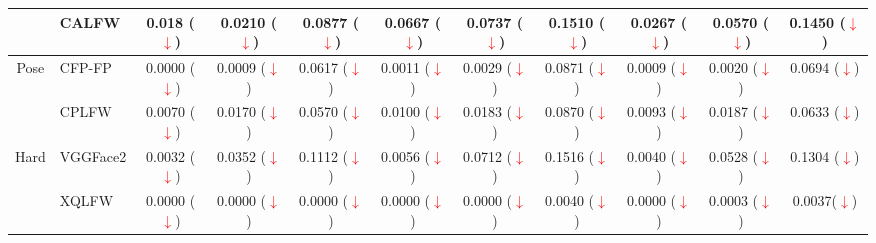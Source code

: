 \documentclass[class=report, crop=false, a4paper, 12pt]{standalone}
\begin{document}
\begin{table}[H]
{\begin{tabular}{cl|ccc|ccc|ccc|}
    \multicolumn{1}{|c|}{}                         & CALFW    & \multicolumn{1}{c|}{0.018 (\textcolor{red}{$\downarrow$})}  & \multicolumn{1}{c|}{0.0210 (\textcolor{red}{$\downarrow$})} & 0.0877 (\textcolor{red}{$\downarrow$}) & \multicolumn{1}{c|}{0.0667 (\textcolor{red}{$\downarrow$})} & \multicolumn{1}{c|}{0.0737 (\textcolor{red}{$\downarrow$})} & 0.1510 (\textcolor{red}{$\downarrow$}) & \multicolumn{1}{c|}{0.0267 (\textcolor{red}{$\downarrow$})} & \multicolumn{1}{c|}{0.0570 (\textcolor{red}{$\downarrow$})} & 0.1450 (\textcolor{red}{$\downarrow$}) \\ \hline
    \multicolumn{1}{|c|}{\multirow{2}{*}{Pose}}    & CFP-FP   & \multicolumn{1}{c|}{0.0000 (\textcolor{red}{$\downarrow$})} & \multicolumn{1}{c|}{0.0009 (\textcolor{red}{$\downarrow$})} & 0.0617 (\textcolor{red}{$\downarrow$}) & \multicolumn{1}{c|}{0.0011 (\textcolor{red}{$\downarrow$})} & \multicolumn{1}{c|}{0.0029 (\textcolor{red}{$\downarrow$})} & 0.0871 (\textcolor{red}{$\downarrow$}) & \multicolumn{1}{c|}{0.0009 (\textcolor{red}{$\downarrow$})} & \multicolumn{1}{c|}{0.0020 (\textcolor{red}{$\downarrow$})} & 0.0694 (\textcolor{red}{$\downarrow$}) \\ \cline{2-11} 
    \multicolumn{1}{|c|}{}                         & CPLFW    & \multicolumn{1}{c|}{0.0070 (\textcolor{red}{$\downarrow$})} & \multicolumn{1}{c|}{0.0170 (\textcolor{red}{$\downarrow$})} & 0.0570 (\textcolor{red}{$\downarrow$}) & \multicolumn{1}{c|}{0.0100 (\textcolor{red}{$\downarrow$})} & \multicolumn{1}{c|}{0.0183 (\textcolor{red}{$\downarrow$})} & 0.0870 (\textcolor{red}{$\downarrow$}) & \multicolumn{1}{c|}{0.0093 (\textcolor{red}{$\downarrow$})} & \multicolumn{1}{c|}{0.0187 (\textcolor{red}{$\downarrow$})} & 0.0633 (\textcolor{red}{$\downarrow$}) \\ \hline
    \multicolumn{1}{|c|}{\multirow{2}{*}{Hard}}    & VGGFace2 & \multicolumn{1}{c|}{0.0032 (\textcolor{red}{$\downarrow$})} & \multicolumn{1}{c|}{0.0352 (\textcolor{red}{$\downarrow$})} & 0.1112 (\textcolor{red}{$\downarrow$}) & \multicolumn{1}{c|}{0.0056 (\textcolor{red}{$\downarrow$})} & \multicolumn{1}{c|}{0.0712 (\textcolor{red}{$\downarrow$})} & 0.1516 (\textcolor{red}{$\downarrow$}) & \multicolumn{1}{c|}{0.0040 (\textcolor{red}{$\downarrow$})} & \multicolumn{1}{c|}{0.0528 (\textcolor{red}{$\downarrow$})} & 0.1304 (\textcolor{red}{$\downarrow$}) \\ \cline{2-11} 
    \multicolumn{1}{|c|}{}                         & XQLFW    & \multicolumn{1}{c|}{0.0000 (\textcolor{red}{$\downarrow$})} & \multicolumn{1}{c|}{0.0000 (\textcolor{red}{$\downarrow$})} & 0.0000 (\textcolor{red}{$\downarrow$}) & \multicolumn{1}{c|}{0.0000 (\textcolor{red}{$\downarrow$})} & \multicolumn{1}{c|}{0.0000 (\textcolor{red}{$\downarrow$})} & 0.0040 (\textcolor{red}{$\downarrow$}) & \multicolumn{1}{c|}{0.0000 (\textcolor{red}{$\downarrow$})} & \multicolumn{1}{c|}{0.0003 (\textcolor{red}{$\downarrow$})} & 0.0037(\textcolor{red}{$\downarrow$})  \\ \hline
    \end{tabular}%
    }
\end{table}
\end{document}
